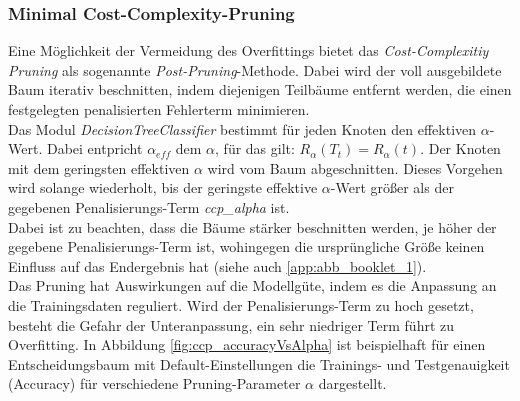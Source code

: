 
\subsubsection{Minimal Cost-Complexity-Pruning}
Eine Möglichkeit der Vermeidung des Overfittings bietet das \emph{Cost-Complexitiy Pruning} als sogenannte \emph{Post-Pruning}-Methode. Dabei wird der voll ausgebildete Baum iterativ beschnitten, indem diejenigen Teilbäume entfernt werden, die einen festgelegten penalisierten Fehlerterm minimieren.\\
\noindent \hspace*{7mm}
Das Modul \emph{DecisionTreeClassifier} bestimmt für jeden Knoten den effektiven $\alpha$-Wert. Dabei entpricht $\alpha_{eff}$ dem $\alpha$, für das gilt: $R_{\alpha}(T_{t})=R_{\alpha}(t)$. Der Knoten mit dem geringsten effektiven $\alpha$ wird vom Baum abgeschnitten. Dieses Vorgehen wird solange wiederholt, bis der geringste effektive $\alpha$-Wert größer als der gegebenen Penalisierungs-Term \emph{ccp\_alpha} ist.\\
\noindent \hspace*{7mm}
Dabei ist zu beachten, dass die Bäume stärker beschnitten werden, je höher der gegebene Penalisierungs-Term ist, wohingegen die ursprüngliche Größe keinen Einfluss auf das Endergebnis hat (siehe auch \ref{app:abb_booklet_1}).\\
\noindent \hspace*{7mm}
Das Pruning hat Auswirkungen auf die Modellgüte, indem es die Anpassung an die Trainingsdaten reguliert. Wird der Penalisierungs-Term zu hoch gesetzt, besteht die Gefahr der Unteranpassung, ein sehr niedriger Term führt zu Overfitting. In Abbildung \ref{fig:ccp_accuracyVsAlpha} ist beispielhaft für einen Entscheidungsbaum mit Default-Einstellungen die Trainings- und Testgenauigkeit (Accuracy) für verschiedene Pruning-Parameter $\alpha$ dargestellt.

